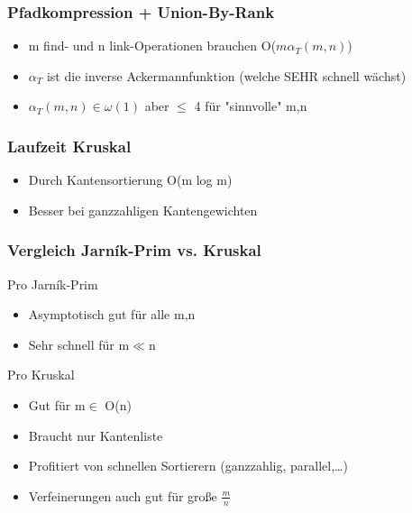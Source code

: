 \begin{frame}
\frametitle{Pfadkompression + Union-By-Rank}
\begin{itemize}
\item m find- und n link-Operationen brauchen O($m\alpha_T(m,n)$)
\item $\alpha_T$ ist die inverse Ackermannfunktion (welche SEHR schnell wächst)
\item $\alpha_T(m,n)\in\omega(1)$ aber $\leq$ 4 für "sinnvolle" m,n
\end{itemize}
\end{frame}

\begin{frame}
\frametitle{Laufzeit Kruskal}
\begin{itemize}
\item Durch Kantensortierung O(m log m)
\item Besser bei ganzzahligen Kantengewichten
\end{itemize}
\end{frame}

\begin{frame}
\frametitle{Vergleich Jarník-Prim vs. Kruskal}
Pro Jarník-Prim
\begin{itemize}
\item Asymptotisch gut für alle m,n
\item Sehr schnell für m$\ll$n
\end{itemize}
Pro Kruskal
\begin{itemize}
\item Gut für m$\in$ O(n)
\item Braucht nur Kantenliste
\item Profitiert von schnellen Sortierern (ganzzahlig, parallel,\ldots)
\item Verfeinerungen auch gut für große $\frac{m}{n}$
\end{itemize}
\end{frame}
